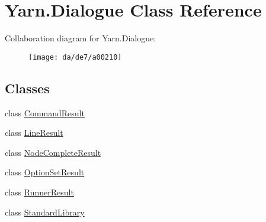 \hypertarget{a00036}{\section{Yarn.\-Dialogue Class Reference}
\label{a00036}
}


Collaboration diagram for Yarn.\-Dialogue\-:
\nopagebreak
\begin{figure}[H]
\begin{center}
\leavevmode
\texttt{[image: da/de7/a00210]}
\end{center}
\end{figure}
\subsection*{Classes}
\begin{DoxyCompactItemize}
\item 
class \hyperlink{a00027}{Command\-Result}
\item 
class \hyperlink{a00050}{Line\-Result}
\item 
class \hyperlink{a00055}{Node\-Complete\-Result}
\item 
class \hyperlink{a00060}{Option\-Set\-Result}
\item 
class \hyperlink{a00069}{Runner\-Result}
\item 
class \hyperlink{a00074}{Standard\-Library}
\end{DoxyCompactItemize}

